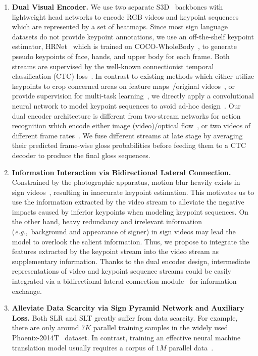 \documentclass{article}
\def\eg{\emph{e.g.}} \def\Eg{\emph{E.g.}}
\begin{document}
\begin{enumerate}[leftmargin=0.5cm]
    \item \textbf{Dual Visual Encoder.} We use two separate S3D~\cite{xie2018rethinking} backbones with lightweight head networks to encode RGB videos and keypoint sequences which are represented by a set of heatmaps. Since most sign language datasets do not provide keypoint annotations, we use an off-the-shelf keypoint estimator, HRNet~\cite{wang2020deep} which is trained on COCO-WholeBody~\cite{jin2020whole}, to generate pseudo keypoints of face, hands, and upper body for each frame. Both streams are supervised by the well-known connectionist temporal classification (CTC) loss~\cite{graves2006connectionist}. In contrast to existing methods which either utilize keypoints to crop concerned areas on feature maps~\cite{STMC_MM}/original videos~\cite{papadimitriou20_interspeech}, or provide supervision for multi-task learning~\cite{STMC_MM,Albanie2020bsl1k}, we directly apply a convolutional neural network to model keypoint sequences to avoid ad-hoc design~\cite{NSLT_keypoint, mseqgraph}. Our dual encoder architecture is different from two-stream networks for action recognition which encode either image (video)/optical flow~\cite{simonyan2014two,carreira2017quo}, or two videos of different frame rates~\cite{feichtenhofer2019slowfast}. We fuse different streams at late stage by averaging their predicted frame-wise gloss probabilities before feeding them to a CTC decoder to produce the final gloss sequences.  
\item \textbf{Information Interaction via Bidirectional Lateral Connection.} Constrained by the photographic apparatus, motion blur heavily exists in sign videos~\cite{P2014, camgoz2018neural}, resulting in inaccurate keypoint estimation. This motivates us to use the information extracted by the video stream to alleviate the negative impacts caused by inferior keypoints when modeling keypoint sequences. On the other hand, heavy redundancy and irrelevant information (\eg,~background and appearance of signer) in sign videos may lead the model to overlook the salient information. Thus, we propose to integrate the features extracted by the keypoint stream into the video stream as supplementary information. Thanks to the dual encoder design, intermediate representations of video and keypoint sequence streams could be easily integrated via a bidirectional lateral connection module~\cite{duan2021revisiting} for information exchange. \item\textbf{Alleviate Data Scarcity via Sign Pyramid Network and Auxiliary Loss.} Both SLR and SLT greatly suffer from data scarcity. For example, there are only around $7K$ parallel training samples in the widely used Phoenix-2014T~\cite{camgoz2018neural} dataset. In contrast, training an effective neural machine translation model usually requires a corpus of $1M$ parallel data~\cite{sennrich2019revisiting}. 

\end{enumerate}
\end{document}
